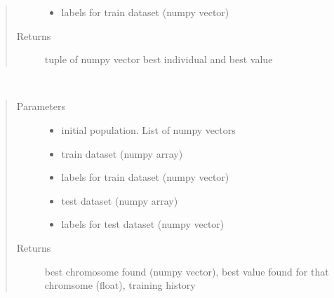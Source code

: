 \documentclass[letterpaper,10pt,english]{sphinxmanual}
\begin{document}
\begin{fulllineitems}
\begin{fulllineitems}
\begin{quote}
\begin{description}
\begin{itemize}
\item {} 
 \textendash{} labels for train dataset (numpy vector)

\end{itemize}

\item[{Returns}] \leavevmode
tuple of numpy vector best individual and best value

\end{description}\end{quote}

\end{fulllineitems}


\begin{fulllineitems}
\label{\detokenize{index:genetic_optimizer.GeneticNeuralOptimizer.fit}}~\begin{quote}\begin{description}
\item[{Parameters}] \leavevmode\begin{itemize}
\item {} 
 \textendash{} initial population. List of numpy vectors

\item {} 
 \textendash{} train dataset (numpy array)

\item {} 
 \textendash{} labels for train dataset (numpy vector)

\item {} 
 \textendash{} test dataset (numpy array)

\item {} 
 \textendash{} labels for test dataset (numpy vector)

\end{itemize}

\item[{Returns}] \leavevmode
best chromosome found (numpy vector), best value found for that chromsome (float), training history


\end{description}
\end{quote}
\end{fulllineitems}
\end{fulllineitems}
\end{document}
